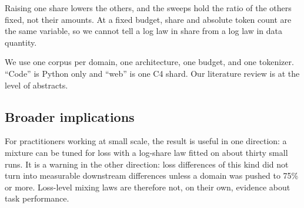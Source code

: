 Raising one share lowers the others, and the sweeps hold the ratio of the others fixed, not their amounts.
At a fixed budget, share and absolute token count are the same variable, so we cannot tell a log law in share from a log law in data quantity.

We use one corpus per domain, one architecture, one budget, and one tokenizer.
``Code'' is Python only and ``web'' is one C4 shard.
Our literature review is at the level of abstracts.

\subsection{Broader implications}

For practitioners working at small scale, the result is useful in one direction: a mixture can be tuned for loss with a log-share law fitted on about thirty small runs.
It is a warning in the other direction: loss differences of this kind did not turn into measurable downstream differences unless a domain was pushed to 75\% or more.
Loss-level mixing laws are therefore not, on their own, evidence about task performance.

